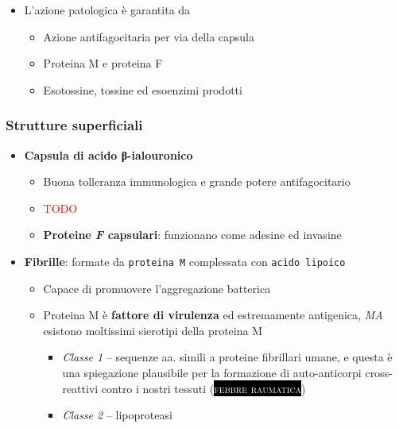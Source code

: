 \documentclass[italian,]{article}
\providecommand{\tightlist}{%
  \setlength{\itemsep}{0pt}\setlength{\parskip}{0pt}}
\newcommand{\pat}[1]{\colorbox{black}{\textcolor{white}{\textsc{#1}}}}
\newcommand{\TODO}[1]{\textcolor{red}{\textsf{\footnotesize{TODO #1}}}} %
\begin{document}
\begin{itemize}
\tightlist
\item
  L'azione patologica è garantita da

  \begin{itemize}
  \tightlist
  \item
    Azione antifagocitaria per via della capsula
  \item
    Proteina M e proteina F
  \item
    Esotossine, tossine ed esoenzimi prodotti
  \end{itemize}
\end{itemize}

\hypertarget{strutture-superficiali}{%
\subsubsection{Strutture superficiali}\label{strutture-superficiali}}

\begin{itemize}
\tightlist
\item
  \textbf{Capsula di acido β-ialouronico}

  \begin{itemize}
  \item
    Buona tolleranza immunologica e grande potere antifagocitario
  \item
    \TODO{}
  \item
    \textbf{Proteine \emph{F} capsulari}: funzionano come adesine ed
    invasine
  \end{itemize}
\item
  \textbf{Fibrille}: formate da \texttt{proteina\ M} complessata con
  \texttt{acido\ lipoico}

  \begin{itemize}
  \tightlist
  \item
    Capace di promuovere l'aggregazione batterica
  \item
    Proteina M è \textbf{fattore di virulenza} ed estremamente
    antigenica, \emph{MA} esistono moltissimi sierotipi della proteina M

    \begin{itemize}
    \tightlist
    \item
      \emph{Classe 1} -- sequenze aa. simili a proteine fibrillari
      umane, e questa è una spiegazione plausibile per la formazione di
      auto-anticorpi cross-reattivi contro i nostri tessuti
      (\pat{febbre raumatica})
    \item
      \emph{Classe 2} -- lipoproteasi
    \end{itemize}
  \end{itemize}
\end{itemize}
\end{document}
